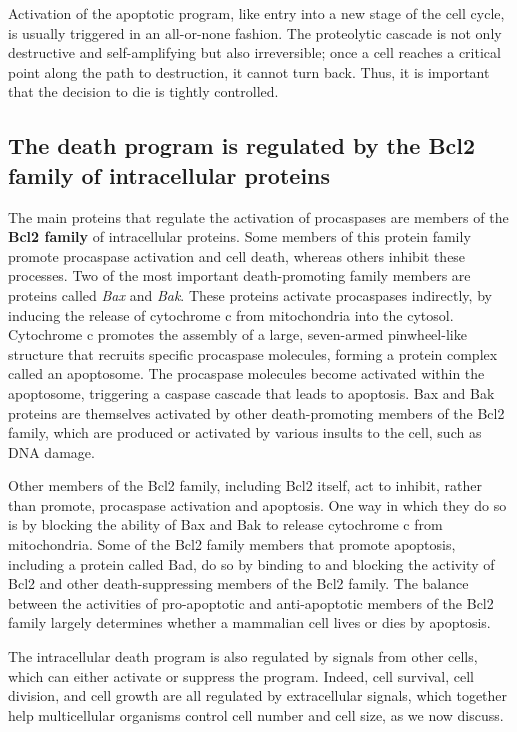 Activation of the apoptotic program, like entry into a new stage of the cell
cycle, is usually triggered in an all-or-none fashion. The proteolytic cascade
is not only destructive and self-amplifying but also irreversible; once
a cell reaches a critical point along the path to destruction, it cannot turn
back. Thus, it is important that the decision to die is tightly controlled.

\subsection{The death program is regulated by the Bcl2 family of intracellular proteins}

The main proteins that regulate the activation of procaspases are members
of the \textbf{Bcl2 family} of intracellular proteins. Some members of this
protein family promote procaspase activation and cell death, whereas
others inhibit these processes. Two of the most important death-promoting
family members are proteins called \textit{Bax} and \textit{Bak}. These proteins
activate procaspases indirectly, by inducing the release of cytochrome c
from mitochondria into the cytosol. Cytochrome c promotes the assembly
of a large, seven-armed pinwheel-like structure that recruits specific procaspase
molecules, forming a protein complex called an apoptosome. The
procaspase molecules become activated within the apoptosome, triggering
a caspase cascade that leads to apoptosis. Bax and Bak
proteins are themselves activated by other death-promoting members of
the Bcl2 family, which are produced or activated by various insults to the
cell, such as DNA damage.

Other members of the Bcl2 family, including Bcl2 itself, act to inhibit,
rather than promote, procaspase activation and apoptosis. One way in
which they do so is by blocking the ability of Bax and Bak to release
cytochrome c from mitochondria. Some of the Bcl2 family members that
promote apoptosis, including a protein called Bad, do so by binding to
and blocking the activity of Bcl2 and other death-suppressing members
of the Bcl2 family. The balance between the activities
of pro-apoptotic and anti-apoptotic members of the Bcl2 family largely
determines whether a mammalian cell lives or dies by apoptosis.

The intracellular death program is also regulated by signals from other
cells, which can either activate or suppress the program. Indeed, cell
survival, cell division, and cell growth are all regulated by extracellular
signals, which together help multicellular organisms control cell number
and cell size, as we now discuss.

